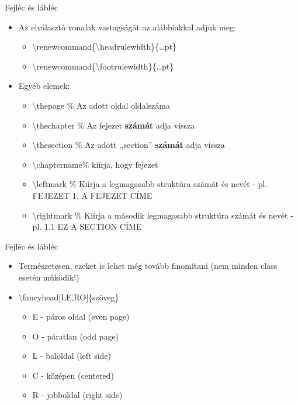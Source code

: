 \documentclass[11pt]{beamer}
\newcommand{\tbs}{\textbackslash}
\begin{document}
\begin{frame}{Fejléc és lábléc}
\begin{itemize}
\item Az elválasztó vonalak vastagságát az alábbiakkal adjuk meg:
	\begin{itemize}
	\item \tbs renewcommand\{\tbs headrulewidth\}\{\dots pt\}
	\item \tbs renewcommand\{\tbs footrulewidth\}\{\dots pt\}
	\end{itemize}
\item Egyéb elemek:
	\begin{itemize}
	\item \tbs thepage \% Az adott oldal oldalszáma
	\item \tbs thechapter \% Az fejezet \textbf{számát} adja vissza
	\item \tbs thesection \% Az adott ,,section'' \textbf{számát} adja vissza
	\item \tbs chaptername\% kiírja, hogy fejezet
	\item \tbs leftmark \% Kiírja a legmagasabb struktúra számát és nevét - pl. FEJEZET 1. A FEJEZET CÍME
	\item \tbs rightmark \% Kiírja a második legmagasabb struktúra számát és nevét - pl. 1.1 EZ A SECTION CÍME
	\end{itemize}
\end{itemize}
\end{frame}




\begin{frame}{Fejléc és lábléc}
\begin{itemize}
\item Természetesen, ezeket is lehet még tovább finomítani (nem minden class esetén működik!)
\item \tbs fancyhead$[$LE,RO$]$\{szöveg\}
	\begin{itemize}
	\item E - páros oldal (even page)
	\item O - páratlan (odd page)
	\item L - baloldal (left side)
	\item C - középen (centered)
	\item R - jobboldal (right side)
	\end{itemize}
\end{itemize}
\end{frame}
\end{document}
